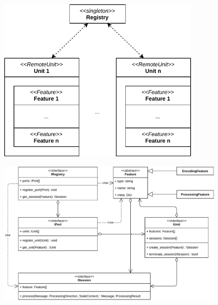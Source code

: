 \begin{figure}[h]
    \centering
    \includegraphics[width=10cm]{img/ch05/registry-remoteunit.pdf}
    \label{fig:registry-units}
\end{figure}
\begin{figure}[ht]
    \centering
    \includegraphics[width=14cm]{img/ch05/component-view2-3-registry-port-unit.pdf}
    \label{fig:component-view2-3-registry-port-unit}
\end{figure}
